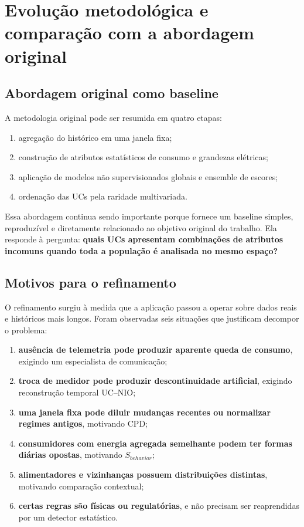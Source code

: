 \chapter{Evolução metodológica e comparação com a abordagem original}\label{evoluuxe7uxe3o-metodoluxf3gica-e-comparauxe7uxe3o-com-a-abordagem-original}

\section{Abordagem original como baseline}\label{abordagem-original-como-baseline}

A metodologia original pode ser resumida em quatro etapas:

\begin{enumerate}
\def\labelenumi{\arabic{enumi}.}
\item
  agregação do histórico em uma janela fixa;
\item
  construção de atributos estatísticos de consumo e grandezas elétricas;
\item
  aplicação de modelos não supervisionados globais e ensemble de escores;
\item
  ordenação das UCs pela raridade multivariada.
\end{enumerate}

Essa abordagem continua sendo importante porque fornece um baseline simples, reproduzível e diretamente relacionado ao objetivo original do trabalho. Ela responde à pergunta: \textbf{quais UCs apresentam combinações de atributos incomuns quando toda a população é analisada no mesmo espaço?}

\section{Motivos para o refinamento}\label{motivos-para-o-refinamento}

O refinamento surgiu à medida que a aplicação passou a operar sobre dados reais e históricos mais longos. Foram observadas seis situações que justificam decompor o problema:

\begin{enumerate}
\def\labelenumi{\arabic{enumi}.}
\item
  \textbf{ausência de telemetria pode produzir aparente queda de consumo}, exigindo um especialista de comunicação;
\item
  \textbf{troca de medidor pode produzir descontinuidade artificial}, exigindo reconstrução temporal UC--NIO;
\item
  \textbf{uma janela fixa pode diluir mudanças recentes ou normalizar regimes antigos}, motivando CPD;
\item
  \textbf{consumidores com energia agregada semelhante podem ter formas diárias opostas}, motivando \(S_{behavior}\);
\item
  \textbf{alimentadores e vizinhanças possuem distribuições distintas}, motivando comparação contextual;
\item
  \textbf{certas regras são físicas ou regulatórias}, e não precisam ser reaprendidas por um detector estatístico.
\end{enumerate}

